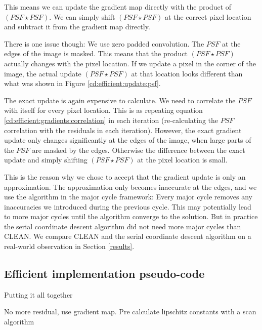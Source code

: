 This means we can update the gradient map directly with the product of $(PSF \star PSF)$. We can simply shift $(PSF \star PSF)$ at the correct pixel location and subtract it from the gradient map directly.

There is one issue though: We use zero padded convolution. The $PSF$ at the edges of the image is masked. This means that the product $(PSF \star PSF)$ actually changes with the pixel location. If we update a pixel in the corner of the image, the actual update $(PSF \star PSF)$ at that location looks different than what was shown in Figure \ref{cd:efficient:update:psf}.

The exact update is again expensive to calculate. We need to correlate the $PSF$ with itself for every pixel location. This is as repeating equation \eqref{cd:efficient:gradients:correlation} in each iteration (re-calculating the $PSF$ correlation with the residuals in each iteration). However, the exact gradient update only changes significantly at the edges of the image, when large parts of the $PSF$ are masked by the edges. Otherwise the difference between the exact update and simply shifting $(PSF \star PSF)$ at the pixel location is small.

This is the reason why we chose to accept that the gradient update is only an approximation. The approximation only becomes inaccurate at the edges, and we use the algorithm in the major cycle framework: Every major cycle removes any inaccuracies we introduced during the previous cycle. This may potentially lead to more major cycles until the algorithm converge to the solution. But in practice the serial coordinate descent algorithm did not need more major cycles than CLEAN. We compare CLEAN and the serial coordinate descent algorithm on a real-world observation in Section \ref{results}.

\subsection{Efficient implementation pseudo-code}

Putting it all together

No more residual, use gradient map.
Pre calculate lipschitz constants with a scan algorithm

